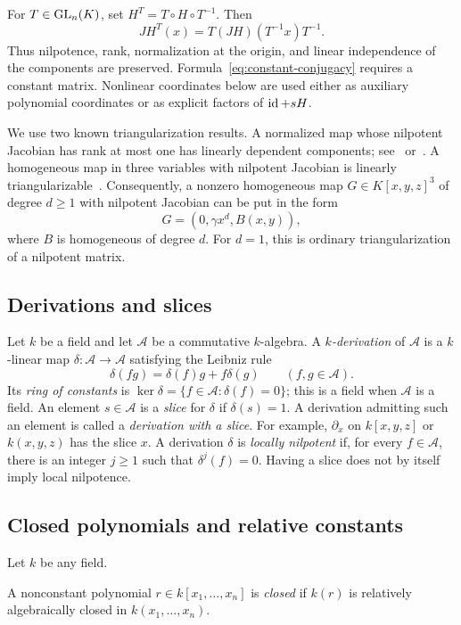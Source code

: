 For $T\in\operatorname{GL}_n(K)$, set $H^T=T\circ H\circ T^{-1}$. Then
\begin{equation}\label{eq:constant-conjugacy}
 JH^T(x)=T(JH)(T^{-1}x)T^{-1}.
\end{equation}
Thus nilpotence, rank, normalization at the origin, and linear independence of the components are preserved. Formula~\eqref{eq:constant-conjugacy} requires a constant matrix. Nonlinear coordinates below are used either as auxiliary polynomial coordinates or as explicit factors of $\operatorname{id}+sH$.

We use two known triangularization results. A normalized map whose nilpotent Jacobian has rank at most one has linearly dependent components; see~\cite{BCW} or~\cite[Theorems~2.3 and~3.4]{deBondtYan2014}. A homogeneous map in three variables with nilpotent Jacobian is linearly triangularizable~\cite{deBondtEssen}. Consequently, a nonzero homogeneous map $G\in K[x,y,z]^3$ of degree $d\geq1$ with nilpotent Jacobian can be put in the form
\begin{equation}\label{eq:homogeneous-form}
 G=(0,\gamma x^d,B(x,y)),
\end{equation}
where $B$ is homogeneous of degree $d$. For $d=1$, this is ordinary triangularization of a nilpotent matrix.

\subsection{Derivations and slices}
Let $k$ be a field and let $\mathcal A$ be a commutative $k$-algebra. A \emph{$k$-derivation} of $\mathcal A$ is a $k$-linear map $\delta\colon\mathcal A\to\mathcal A$ satisfying the Leibniz rule
\[
 \delta(fg)=\delta(f)g+f\delta(g)\qquad(f,g\in\mathcal A).
\]
Its \emph{ring of constants} is $\ker\delta=\{f\in\mathcal A:\delta(f)=0\}$; this is a field when $\mathcal A$ is a field. An element $s\in\mathcal A$ is a \emph{slice} for $\delta$ if $\delta(s)=1$. A derivation admitting such an element is called a \emph{derivation with a slice}. For example, $\partial_x$ on $k[x,y,z]$ or $k(x,y,z)$ has the slice $x$.
A derivation $\delta$ is \emph{locally nilpotent} if, for every $f\in\mathcal A$, there is an integer $j\geq1$ such that $\delta^j(f)=0$. Having a slice does not by itself imply local nilpotence. 

\subsection{Closed polynomials and relative constants}
Let $k$ be any field.
\begin{definition}\label{def:closed}
A nonconstant polynomial $r\in k[x_1,\ldots,x_n]$ is \emph{closed} if $k(r)$ is relatively algebraically closed in $k(x_1,\ldots,x_n)$.
\end{definition}

